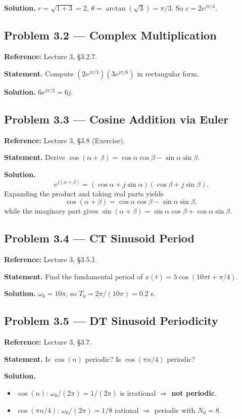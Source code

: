 \documentclass[11pt]{article}
\begin{document}
\textbf{Solution.} $r=\sqrt{1+3}=2$, $\theta=\arctan(\sqrt 3)=\pi/3$. So $c=2e^{j\pi/3}$.

\subsection{Problem 3.2 --- Complex Multiplication}
\textbf{Reference:} Lecture 3, \S 3.2.7.

\textbf{Statement.} Compute $(2e^{j\pi/3})(3e^{j\pi/6})$ in rectangular form.

\textbf{Solution.} $6 e^{j\pi/2} = 6j$.

\subsection{Problem 3.3 --- Cosine Addition via Euler}
\textbf{Reference:} Lecture 3, \S 3.8 (Exercise).

\textbf{Statement.} Derive $\cos(\alpha+\beta)=\cos\alpha\cos\beta-\sin\alpha\sin\beta$.

\textbf{Solution.}
\[
e^{j(\alpha+\beta)}=(\cos\alpha+j\sin\alpha)(\cos\beta+j\sin\beta).
\]
Expanding the product and taking real parts yields
\[
\cos(\alpha+\beta)=\cos\alpha\cos\beta-\sin\alpha\sin\beta,
\]
while the imaginary part gives $\sin(\alpha+\beta)=\sin\alpha\cos\beta+\cos\alpha\sin\beta$.

\subsection{Problem 3.4 --- CT Sinusoid Period}
\textbf{Reference:} Lecture 3, \S 3.5.1.

\textbf{Statement.} Find the fundamental period of $x(t)=5\cos(10\pi t+\pi/4)$.

\textbf{Solution.} $\omega_0=10\pi$, so $T_0 = 2\pi/(10\pi) = 0.2$ s.

\subsection{Problem 3.5 --- DT Sinusoid Periodicity}
\textbf{Reference:} Lecture 3, \S 3.7.

\textbf{Statement.} Is $\cos(n)$ periodic? Is $\cos(\pi n/4)$ periodic?

\textbf{Solution.}
\begin{itemize}[leftmargin=*]
  \item $\cos(n)$: $\omega_0/(2\pi) = 1/(2\pi)$ is irrational $\Rightarrow$ \textbf{not periodic}.
  \item $\cos(\pi n/4)$: $\omega_0/(2\pi) = 1/8$ rational $\Rightarrow$ periodic with $N_0 = 8$.
\end{itemize}
\end{document}
